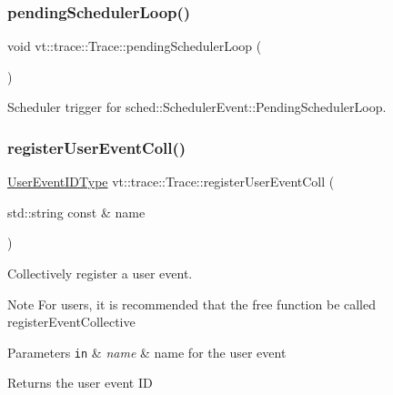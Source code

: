 \subsubsection{\texorpdfstring{pending\+Scheduler\+Loop()}{pendingSchedulerLoop()}}
{\footnotesize\ttfamily void vt\+::trace\+::\+Trace\+::pending\+Scheduler\+Loop (\begin{DoxyParamCaption}{ }\end{DoxyParamCaption})}



Scheduler trigger for {\ttfamily sched\+::\+Scheduler\+Event\+::\+Pending\+Scheduler\+Loop}. 

\mbox{\label{structvt_1_1trace_1_1_trace_a9a106f7f39e605745994d20bb526f8cf}} 
\subsubsection{\texorpdfstring{register\+User\+Event\+Coll()}{registerUserEventColl()}}
{\footnotesize\ttfamily \hyperlink{namespacevt_1_1trace_a5908920d051c144c89f17c69ed262350}{User\+Event\+I\+D\+Type} vt\+::trace\+::\+Trace\+::register\+User\+Event\+Coll (\begin{DoxyParamCaption}\item[{std\+::string const \&}]{name }\end{DoxyParamCaption})}



Collectively register a user event. 

\begin{DoxyNote}{Note}
For users, it is recommended that the free function be called {\ttfamily register\+Event\+Collective} 
\end{DoxyNote}

\begin{DoxyParams}[1]{Parameters}
\mbox{\tt in}  & {\em name} & name for the user event\\
\hline
\end{DoxyParams}
\begin{DoxyReturn}{Returns}
the user event ID 
\end{DoxyReturn}
\mbox{\label{structvt_1_1trace_1_1_trace_a1b80a8ca6bebbfbe61f8b119342e14f7}} 
